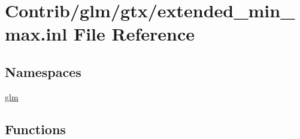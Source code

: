 \hypertarget{extended__min__max_8inl}{}\section{Contrib/glm/gtx/extended\+\_\+min\+\_\+max.inl File Reference}
\label{extended__min__max_8inl}
\subsection*{Namespaces}
\begin{DoxyCompactItemize}
\item 
 \mbox{\hyperlink{namespaceglm}{glm}}
\end{DoxyCompactItemize}
\subsection*{Functions}
